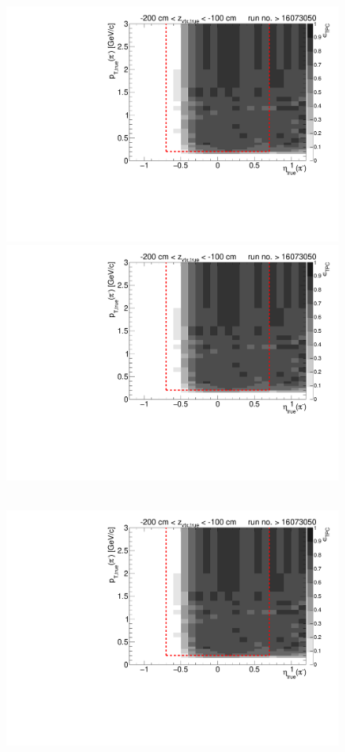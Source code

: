 \begin{figure}[hb]
{		\includegraphics[width=\linewidth,page=7]{graphics/eff/Eff2D_TPC_pion_Minus_RunRange2.pdf}\\
		\includegraphics[width=\linewidth,page=9]{graphics/eff/Eff2D_TPC_pion_Minus_RunRange2.pdf}
	}~
	\parbox{0.495\textwidth}{
		\centering
		\includegraphics[width=\linewidth,page=4]{graphics/eff/Eff2D_TPC_pion_Minus_RunRange2.pdf}\\
}
\end{figure}
